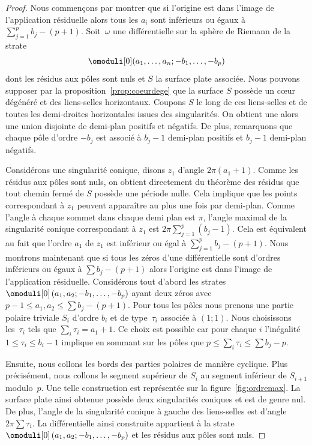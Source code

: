 \begin{proof}
Nous commençons par montrer que si l'origine est dans l'image de l'application résiduelle alors tous les $a_{i}$ sont inférieurs ou égaux à $\sum_{j=1}^p b_{j}-(p+1)$.
Soit~$\omega$ une différentielle sur la sphère de Riemann de la strate
\[
\omoduli[0](a_{1},\dots,a_{n};-b_{1},\dots,-b_{p})
\]
dont les résidus aux pôles sont nuls et $S$ la surface plate associée. Nous pouvons supposer par la proposition~\ref{prop:coeurdege} que la surface $S$ possède un cœur dégénéré et des liens-selles horizontaux. Coupons $S$ le long de ces liens-selles et de toutes les demi-droites horizontales issues des singularités. On obtient une alors une union disjointe de demi-plan positifs et négatifs. De plus, remarquons que chaque pôle d'ordre $-b_{j}$ est associé à $b_{j}-1$ demi-plan positifs et $b_{j}-1$ demi-plan négatifs.

Considérons une singularité conique, disons $z_{1}$ d'angle $2\pi(a_{1}+1)$. Comme les résidus aux pôles sont nuls, on obtient directement du théorème des résidus que tout chemin fermé de $S$ possède une période nulle.
Cela implique que les points correspondant à $z_{1}$ peuvent apparaître au plus une fois par demi-plan.
Comme l'angle à chaque sommet dans chaque demi plan est $\pi$, l'angle maximal de la singularité conique correspondant à $z_{1}$ est $2\pi\sum_{j=1}^p (b_{j}-1)$. Cela est équivalent au fait que l'ordre $a_{1}$ de $z_{1}$ est inférieur ou égal à $\sum_{j=1}^p b_{j}-(p+1)$.
Nous montrons maintenant que si tous les zéros d'une différentielle sont d'ordres inférieurs ou égaux à $\sum b_{j}-(p+1)$ alors l'origine est dans l'image de l'application résiduelle.
Considérons tout d'abord les strates $\omoduli[0]\left(a_{1},a_{2};-b_{1},\dots,-b_{p}\right)$ ayant deux zéros avec $p-1\leq a_{1},a_{2}\leq \sum b_{j} -(p+1)$. Pour tous les pôles nous prenons une partie polaire triviale $S_{i}$ d'ordre $b_{i}$ et de type~$\tau_{i}$ associée à $(1;1)$. Nous choisissons les~$\tau_{i}$ tels que $\sum_{i}\tau_{i}=a_{1}+1$. Ce choix est possible car pour chaque $i$ l'inégalité $1\leq \tau_{i} \leq b_{i}-1$ implique en sommant sur les pôles que $p\leq\sum_{i}\tau_{i}\leq \sum b_{j}-p$.

Ensuite, nous collons les bords des parties polaires de manière cyclique. Plus précisément, nous collons le segment supérieur de $S_{i}$ au segment inférieur de $S_{i+1}$ modulo~$p$. Une telle construction est représentée sur la figure~\ref{fig:ordremax}. La surface plate ainsi obtenue possède deux singularités coniques et est de genre nul. De plus, l'angle de la singularité conique à gauche des liens-selles est d'angle $2\pi\sum \tau_{i}$. La différentielle ainsi construite appartient à la strate $\omoduli[0]\left(a_{1},a_{2};-b_{1},\dots,-b_{p}\right)$ et les résidus aux pôles sont nuls.


\end{proof}

